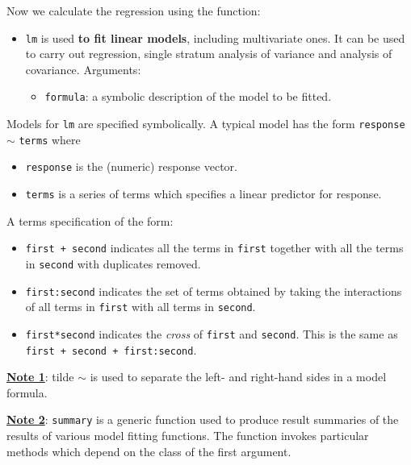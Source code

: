 \documentclass[a4paper]{article}
\begin{document}
    \noindent
    Now we calculate the regression using the function:
    \begin{itemize}
        \item \texttt{lm} is used \textbf{to fit linear models}, including multivariate ones. It can be used to carry out regression, single stratum analysis of variance and analysis of covariance. Arguments:
        \begin{itemize}
            \item \texttt{formula}: a symbolic description of the model to be fitted.
        \end{itemize}
    \end{itemize}
    Models for \texttt{lm} are specified symbolically. A typical model has the form \texttt{response} $\sim$ \texttt{terms} where 
    \begin{itemize}
        \item \texttt{response} is the (numeric) response vector.
        \item \texttt{terms} is a series of terms which specifies a linear predictor for response.
    \end{itemize}
    A terms specification of the form:
    \begin{itemize}
        \item \texttt{first + second} indicates all the terms in \texttt{first} together with all the terms in \texttt{second} with duplicates removed.
        
        \item \texttt{first:second} indicates the set of terms obtained by taking the interactions of all terms in \texttt{first} with all terms in \texttt{second}.

        \item \texttt{first*second} indicates the \emph{cross} of \texttt{first} and \texttt{second}. This is the same as \texttt{first + second + first:second}.
    \end{itemize}
    \underline{\textbf{Note 1}}: tilde $\sim$ is used to separate the left- and right-hand sides in a model formula.

    \noindent
    \underline{\textbf{Note 2}}: \texttt{summary} is a generic function used to produce result summaries of the results of various model fitting functions. The function invokes particular methods which depend on the class of the first argument.
    

    \newpage
\end{document}
